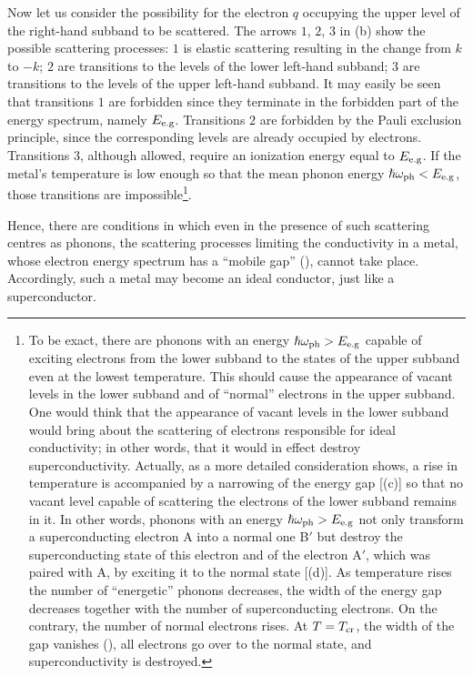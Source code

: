 Now let us consider the possibility for the electron $q$ occupying the upper level of the right-hand subband to be scattered. The arrows $1$, $2$, $3$ in (b) show the possible scattering processes: $1$ is elastic scattering resulting in the change from $k$ to $-k$; $2$ are transitions to the levels of the lower left-hand subband; $3$ are transitions to the levels of the upper left-hand subband. It may easily be seen that transitions $1$ are forbidden since they terminate in the forbidden
part of the energy spectrum, namely $E_{\text{e.g}}$. Transitions $2$ are forbidden by the Pauli exclusion principle, since the corresponding levels
are already occupied by electrons. Transitions $3$, although allowed, require an ionization energy equal to $E_{\text{e.g}}$. If the metal's temperature
is low enough so that the mean phonon energy $\hslash\omega_{\text{ph}}<E_{\text{e.g}}$, those transitions are impossible\footnote{To be exact, there are phonons with an energy $\hslash\omega_{\text{ph}}>E_{\text{e.g}}$ capable of
exciting electrons from the lower subband to the states of the upper subband even at the lowest temperature. This should cause the appearance of vacant levels in the lower subband and of ``normal'' electrons in the upper subband. One would think that the appearance of vacant levels in the lower subband would bring about the scattering of electrons responsible for ideal conductivity; in other words, that it would in effect destroy superconductivity. Actually, as a more detailed consideration shows, a rise in temperature is accompanied by a narrowing of the energy gap [(c)] so that no vacant level capable of scattering the electrons of the lower subband remains in it. In other words, phonons with an energy $\hslash\omega_{\text{ph}}>E_{\text{e.g}}$ not only transform a superconducting electron A into a normal one B$'$ but destroy the superconducting state of this electron and of the electron A$'$, which was paired with A, by exciting it to the
normal state [(d)]. As temperature rises the number of ``energetic'' phonons decreases, the width of the energy gap decreases together with the
number of superconducting electrons. On the contrary, the number of normal electrons rises. At $T=T_{\text{cr}}$, the width of the gap vanishes (), all electrons go over to the normal state, and superconductivity is destroyed.}.

Hence, there are conditions in which even in the presence of such scattering centres as phonons, the scattering processes limiting the conductivity in a metal, whose electron energy spectrum has a ``mobile gap'' (), cannot take place. Accordingly, such a metal may become an ideal conductor, just like a superconductor.

